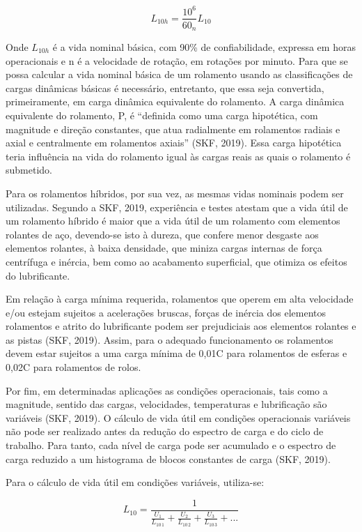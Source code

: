 \documentclass[
	12pt,				
	oneside,			
	a4paper,			
	english,			
	brazil,			
	]{abntex2ppgsi}
\begin{document}
\begin{equation}
	L_{10h}= \frac{10^{6}}{60_{n}}L_{10}
	\label{eq: Vida Útil em Horas}
\end{equation}

Onde $L_{10h}$ é a vida nominal básica, com 90\% de confiabilidade, expressa em horas operacionais e n é a velocidade de rotação, em rotações por minuto. 
Para que se possa calcular a vida nominal básica de um rolamento usando as classificações de cargas dinâmicas básicas é necessário, entretanto, que essa seja convertida, primeiramente, em carga dinâmica equivalente do rolamento. A carga dinâmica equivalente do rolamento, P, é “definida como uma carga hipotética, com magnitude e direção constantes, que atua radialmente em rolamentos radiais e axial e centralmente em rolamentos axiais” (SKF, 2019). Essa carga hipotética teria influência na vida do rolamento igual às cargas reais as quais o rolamento é submetido.

Para os rolamentos híbridos, por sua vez, as mesmas vidas nominais podem ser utilizadas. Segundo a SKF, 2019, experiência e testes atestam que a vida útil de um rolamento híbrido é maior que a vida útil de um rolamento com elementos rolantes de aço, devendo-se isto à dureza, que confere menor desgaste aos elementos rolantes, à baixa densidade, que miniza cargas internas de força centrífuga e inércia, bem como ao acabamento superficial, que otimiza os efeitos do lubrificante.

Em relação à carga mínima requerida, rolamentos que operem em alta velocidade e/ou estejam sujeitos a acelerações bruscas, forças de inércia dos elementos rolamentos e atrito do lubrificante podem ser prejudiciais aos elementos rolantes e as pistas (SKF, 2019). Assim, para o adequado funcionamento os rolamentos devem estar sujeitos a uma carga mínima de 0,01C para rolamentos de esferas e 0,02C para rolamentos de rolos. 

Por fim, em determinadas aplicações as condições operacionais, tais como a magnitude, sentido das cargas, velocidades, temperaturas e lubrificação são variáveis (SKF, 2019). O cálculo de vida útil em condições operacionais variáveis não pode ser realizado antes da redução do espectro de carga e do ciclo de trabalho. Para tanto, cada nível de carga pode ser acumulado e o espectro de carga reduzido a um histograma de blocos constantes de carga (SKF, 2019).

Para o cálculo de vida útil em condições variáveis, utiliza-se:

\begin{equation}
	L_{10}= \frac{1}{ \frac{U_{1}}{L_{10 \,1}} + \frac{U_{2}}{L_{10 \,2}} + \frac{U_{3}}{L_{10 \,3}} + ...}
	\label{eq:Calculo da vida Util em condições variaveis}
\end{equation}
\end{document}
